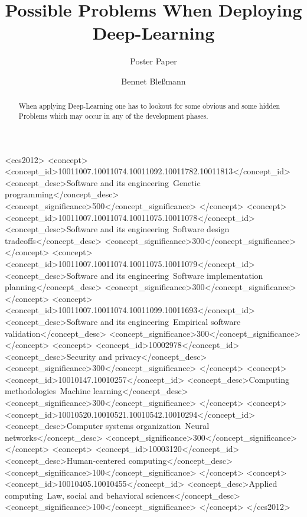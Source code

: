 \documentclass[sigconf,nonacm,natbib=false]{acmart}
\begin{document}
%
\title{Possible Problems When Deploying Deep-Learning}
\subtitle{Poster Paper}

%
\author{Bennet Bleßmann}

%
\begin{abstract}
When applying Deep-Learning one has to lookout for some obvious and some hidden 
Problems which may occur in any of the development phases.
\end{abstract}

%
%
\begin{CCSXML}
<ccs2012>
<concept>
<concept_id>10011007.10011074.10011092.10011782.10011813</concept_id>
<concept_desc>Software and its engineering~Genetic programming</concept_desc>
<concept_significance>500</concept_significance>
</concept>
<concept>
<concept_id>10011007.10011074.10011075.10011078</concept_id>
<concept_desc>Software and its engineering~Software design tradeoffs</concept_desc>
<concept_significance>300</concept_significance>
</concept>
<concept>
<concept_id>10011007.10011074.10011075.10011079</concept_id>
<concept_desc>Software and its engineering~Software implementation planning</concept_desc>
<concept_significance>300</concept_significance>
</concept>
<concept>
<concept_id>10011007.10011074.10011099.10011693</concept_id>
<concept_desc>Software and its engineering~Empirical software validation</concept_desc>
<concept_significance>300</concept_significance>
</concept>
<concept>
<concept_id>10002978</concept_id>
<concept_desc>Security and privacy</concept_desc>
<concept_significance>300</concept_significance>
</concept>
<concept>
<concept_id>10010147.10010257</concept_id>
<concept_desc>Computing methodologies~Machine learning</concept_desc>
<concept_significance>300</concept_significance>
</concept>
<concept>
<concept_id>10010520.10010521.10010542.10010294</concept_id>
<concept_desc>Computer systems organization~Neural networks</concept_desc>
<concept_significance>300</concept_significance>
</concept>
<concept>
<concept_id>10003120</concept_id>
<concept_desc>Human-centered computing</concept_desc>
<concept_significance>100</concept_significance>
</concept>
<concept>
<concept_id>10010405.10010455</concept_id>
<concept_desc>Applied computing~Law, social and behavioral sciences</concept_desc>
<concept_significance>100</concept_significance>
</concept>
</ccs2012>
\end{CCSXML}
\end{document}
